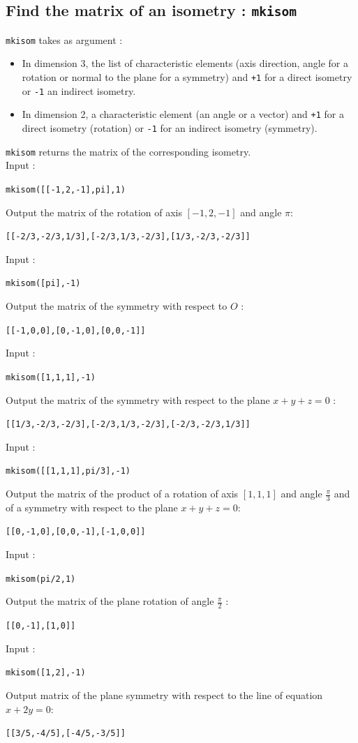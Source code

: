 \documentclass[a4paper,11pt]{book}
\begin{document}
\subsection{Find the matrix of an isometry : {\tt mkisom}}
{\tt mkisom} takes as argument :
\begin{itemize}
\item  In dimension 3, the list of characteristic elements 
(axis direction, angle for a rotation or normal to the plane for
a symmetry) and {\tt +1} for a direct isometry or 
{\tt -1} an indirect isometry.
\item In dimension 2,  a characteristic element (an angle or a vector) and 
{\tt +1} for a direct isometry (rotation) or {\tt -1} for an
indirect isometry (symmetry).
\end{itemize}
{\tt mkisom} returns the matrix of the corresponding isometry.\\ 
Input :
\begin{center}{\tt mkisom([[-1,2,-1],pi],1)}\end{center}
Output the matrix of the rotation of axis $[-1,2,-1]$ and angle $\pi$:
\begin{center}{\tt [[-2/3,-2/3,1/3],[-2/3,1/3,-2/3],[1/3,-2/3,-2/3]]}\end{center}
Input :
\begin{center}{\tt  mkisom([pi],-1)}\end{center}
Output the matrix of the symmetry with respect to $O$ :
\begin{center}{\tt [[-1,0,0],[0,-1,0],[0,0,-1]]}\end{center}
Input :
\begin{center}{\tt  mkisom([1,1,1],-1)}\end{center}
Output the matrix of the symmetry with respect to the plane $x+y+z=0$ :
\begin{center}{\tt [[1/3,-2/3,-2/3],[-2/3,1/3,-2/3],[-2/3,-2/3,1/3]]}\end{center}
Input :
\begin{center}{\tt mkisom([[1,1,1],pi/3],-1)}\end{center}
Output the matrix of the product of a rotation of axis $[1,1,1]$ and angle 
$\frac{\pi}{3}$ and of a symmetry with respect to the plane $x+y+z=0$:
\begin{center}{\tt  [[0,-1,0],[0,0,-1],[-1,0,0]]}\end{center}
Input :
\begin{center}{\tt mkisom(pi/2,1)}\end{center}
Output the matrix of the plane rotation of angle $\frac{\pi}{2}$ :
\begin{center}{\tt [[0,-1],[1,0]]}\end{center}
Input :
\begin{center}{\tt mkisom([1,2],-1)}\end{center}
Output matrix of the plane symmetry with respect to the line 
of equation $x+2y=0$:
\begin{center}{\tt [[3/5,-4/5],[-4/5,-3/5]]}\end{center}
\end{document}
